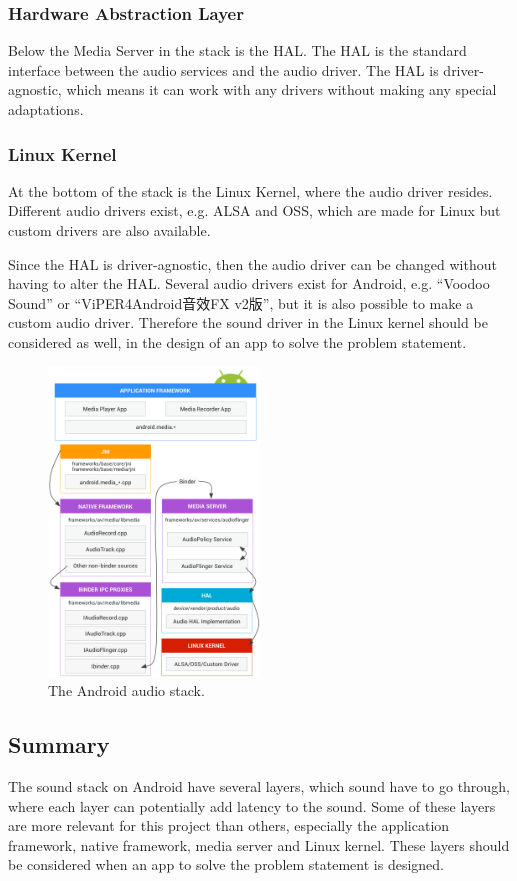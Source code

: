 \subsubsection*{Hardware Abstraction Layer}
Below the Media Server in the stack is the \ac{HAL}.
The \ac{HAL} is the standard interface between the audio services and the audio driver.
The \ac{HAL} is driver-agnostic, which means it can work with any drivers without making any special adaptations.

\subsubsection*{Linux Kernel}
At the bottom of the stack is the Linux Kernel, where the audio driver resides.
Different audio drivers exist, e.g. \ac{ALSA} and \ac{OSS}, which are made for Linux but custom drivers are also available.

Since the \ac{HAL} is driver-agnostic, then the audio driver can be changed without having to alter the \ac{HAL}.
Several audio drivers exist for Android, e.g. ``Voodoo Sound'' or ``ViPER4Android音效FX v2版'',
but it is also possible to make a custom audio driver\cite{voodoo_sound}\cite{viper4_android}.
Therefore the sound driver in the Linux kernel should be considered as well, in the design of an app to solve the problem statement.
\begin{figure}[!bht]
    \centering
    \includegraphics[width=0.5\textwidth]{img/sound_stack.png}
    \caption{The Android audio stack\cite{sound_stack}.}
    \label{fig:sound_stack}
\end{figure}

\subsection{Summary}
The sound stack on Android have several layers, which sound have to go through,
where each layer can potentially add latency to the sound.
Some of these layers are more relevant for this project than others,
especially the application framework, native framework, media server and Linux kernel.
These layers should be considered when an app to solve the problem statement is designed.


